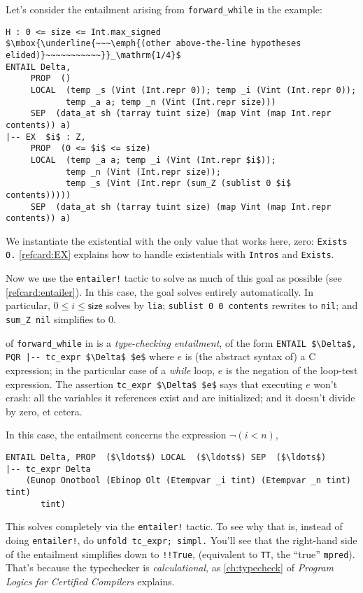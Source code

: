 \documentclass[12pt,fleqn,openany,oneside,showtrims]{memoir}
\begin{document}
Let's consider the entailment arising from \lstinline{forward_while}
in the \linebreak {} example:
\begin{lstlisting}
H : 0 <= size <= Int.max_signed
$\mbox{\underline{~~~\emph{(other above-the-line hypotheses elided)}~~~~~~~~~~~}}_\mathrm{1/4}$
ENTAIL Delta,
     PROP  ()
     LOCAL  (temp _s (Vint (Int.repr 0)); temp _i (Vint (Int.repr 0));
            temp _a a; temp _n (Vint (Int.repr size)))
     SEP  (data_at sh (tarray tuint size) (map Vint (map Int.repr contents)) a)
|-- EX  $i$ : Z,
     PROP  (0 <= $i$ <= size)
     LOCAL  (temp _a a; temp _i (Vint (Int.repr $i$));
            temp _n (Vint (Int.repr size));
            temp _s (Vint (Int.repr (sum_Z (sublist 0 $i$ contents)))))
     SEP  (data_at sh (tarray tuint size) (map Vint (map Int.repr contents)) a)
\end{lstlisting}
We instantiate the existential with the only value that works here, zero:
\lstinline{Exists 0.}
\autoref{refcard:EX} explains how to handle existentials with
\lstinline{Intros} and \lstinline{Exists}.

Now we use the \lstinline{entailer!} tactic to solve as much of this goal
as possible (see \autoref{refcard:entailer}). In this case, the goal solves
entirely automatically.
In particular, $0\le i \le \mathsf{size}$ solves by \lstinline{lia};
\lstinline{sublist 0 0 contents} rewrites to \lstinline{nil};
and \lstinline{sum_Z nil} simplifies to 0.

 of \lstinline{forward_while}
in  is a \emph{type-checking entailment},
of the form
\lstinline{ENTAIL $\Delta$, PQR |-- tc_expr $\Delta$ $e$}\newline
where $e$ is (the abstract syntax of) a C expression;
in the particular case of a \emph{while} loop, $e$
is the negation of the loop-test expression.
The assertion \lstinline{tc_expr $\Delta$ $e$}
says that executing $e$ won't crash: all the variables it references
exist and are initialized; and it doesn't divide by zero, et cetera.

In this case, the entailment concerns the expression
$\neg(i<n)$,
\begin{lstlisting}
ENTAIL Delta, PROP  ($\ldots$) LOCAL  ($\ldots$) SEP  ($\ldots$)
|-- tc_expr Delta
    (Eunop Onotbool (Ebinop Olt (Etempvar _i tint) (Etempvar _n tint) tint)
       tint)
\end{lstlisting}
This solves completely via the \lstinline{entailer!} tactic.
To see why that is, instead of doing \lstinline{entailer!},
do \lstinline{unfold tc_expr; simpl.}  You'll see that the
right-hand side of the entailment simplifies down to \lstinline{!!True},
(equivalent to \lstinline{TT}, the ``true'' \lstinline{mpred}).
That's because the typechecker is \emph{calculational},
as \autoref{ch:typecheck} of \emph{Program Logics for Certified Compilers} explains.
\end{document}
